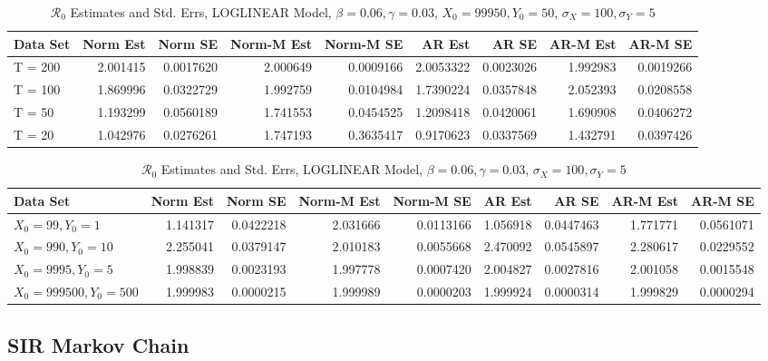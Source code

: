 \documentclass[12pt]{article}
\newcommand{\rr}{\ensuremath{\mathcal{R}_0}}
\begin{document}
\begin{table}[H]
	
	\caption{\label{tab:}$\rr$ Estimates and Std. Errs, LOGLINEAR Model,
		$\beta = 0.06, \gamma = 0.03$, $X_0 = 99950, Y_0 = 50$, $\sigma_X = 100, \sigma_Y = 5$}
	\centering
	\begin{tabular}[t]{l|r|r|r|r|r|r|r|r}
		\hline
		Data Set & Norm Est & Norm SE & Norm-M Est & Norm-M SE & AR Est & AR SE & AR-M Est & AR-M SE\\
		\hline
		T = 200 & 2.001415 & 0.0017620 & 2.000649 & 0.0009166 & 2.0053322 & 0.0023026 & 1.992983 & 0.0019266\\
		\hline
		T = 100 & 1.869996 & 0.0322729 & 1.992759 & 0.0104984 & 1.7390224 & 0.0357848 & 2.052393 & 0.0208558\\
		\hline
		T = 50 & 1.193299 & 0.0560189 & 1.741553 & 0.0454525 & 1.2098418 & 0.0420061 & 1.690908 & 0.0406272\\
		\hline
		T = 20 & 1.042976 & 0.0276261 & 1.747193 & 0.3635417 & 0.9170623 & 0.0337569 & 1.432791 & 0.0397426\\
		\hline
	\end{tabular}
\end{table}

\begin{table}[H]
	
	\caption{\label{tab:}$\rr$ Estimates and Std. Errs, LOGLINEAR Model,
		$\beta = 0.06, \gamma = 0.03$, $\sigma_X = 100, \sigma_Y = 5$}
	\centering
	\begin{tabular}[t]{l|r|r|r|r|r|r|r|r}
		\hline
		Data Set & Norm Est & Norm SE & Norm-M Est & Norm-M SE & AR Est & AR SE & AR-M Est & AR-M SE\\
		\hline
		$X_0 = 99, Y_0 = 1$ & 1.141317 & 0.0422218 & 2.031666 & 0.0113166 & 1.056918 & 0.0447463 & 1.771771 & 0.0561071\\
		\hline
		$X_0 = 990, Y_0 = 10$ & 2.255041 & 0.0379147 & 2.010183 & 0.0055668 & 2.470092 & 0.0545897 & 2.280617 & 0.0229552\\
		\hline
		$X_0 = 9995, Y_0 = 5$ & 1.998839 & 0.0023193 & 1.997778 & 0.0007420 & 2.004827 & 0.0027816 & 2.001058 & 0.0015548\\
		\hline
		$X_0 = 999500, Y_0 = 500$ & 1.999983 & 0.0000215 & 1.999989 & 0.0000203 & 1.999924 & 0.0000314 & 1.999829 & 0.0000294\\
		\hline
	\end{tabular}
\end{table}

\subsection{SIR Markov Chain}
\end{document}
